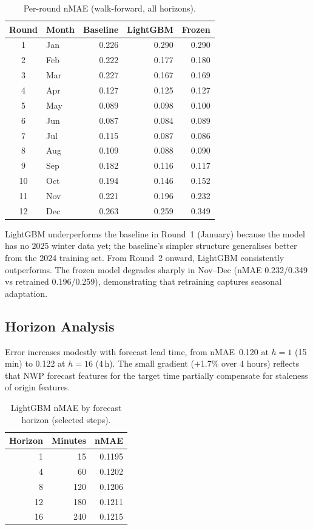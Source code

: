 \documentclass[11pt,a4paper]{article}
\begin{document}
\begin{table}[H]
\centering
\caption{Per-round nMAE (walk-forward, all horizons).}\label{tab:monthly}
\small
\begin{tabular}{@{}clrrr@{}}
\toprule
Round & Month & Baseline & LightGBM & Frozen \\
\midrule
1 & Jan & 0.226 & 0.290 & 0.290 \\
2 & Feb & 0.222 & 0.177 & 0.180 \\
3 & Mar & 0.227 & 0.167 & 0.169 \\
4 & Apr & 0.127 & 0.125 & 0.127 \\
5 & May & 0.089 & 0.098 & 0.100 \\
6 & Jun & 0.087 & 0.084 & 0.089 \\
7 & Jul & 0.115 & 0.087 & 0.086 \\
8 & Aug & 0.109 & 0.088 & 0.090 \\
9 & Sep & 0.182 & 0.116 & 0.117 \\
10 & Oct & 0.194 & 0.146 & 0.152 \\
11 & Nov & 0.221 & 0.196 & 0.232 \\
12 & Dec & 0.263 & 0.259 & 0.349 \\
\bottomrule
\end{tabular}
\end{table}

LightGBM underperforms the baseline in Round~1 (January) because the model has no 2025 winter data yet; the baseline's simpler structure generalises better from the 2024 training set.
From Round~2 onward, LightGBM consistently outperforms.
The frozen model degrades sharply in Nov--Dec (nMAE 0.232/0.349 vs retrained 0.196/0.259), demonstrating that retraining captures seasonal adaptation.

\subsection{Horizon Analysis}

Error increases modestly with forecast lead time, from nMAE~0.120 at $h{=}1$ (15\,min) to 0.122 at $h{=}16$ (4\,h).
The small gradient ($+$1.7\% over 4 hours) reflects that NWP forecast features for the target time partially compensate for staleness of origin features.

\begin{table}[H]
\centering
\caption{LightGBM nMAE by forecast horizon (selected steps).}\label{tab:horizon}
\small
\begin{tabular}{@{}rrr@{}}
\toprule
Horizon & Minutes & nMAE \\
\midrule
1 & 15 & 0.1195 \\
4 & 60 & 0.1202 \\
8 & 120 & 0.1206 \\
12 & 180 & 0.1211 \\
16 & 240 & 0.1215 \\
\bottomrule
\end{tabular}
\end{table}
\end{document}
